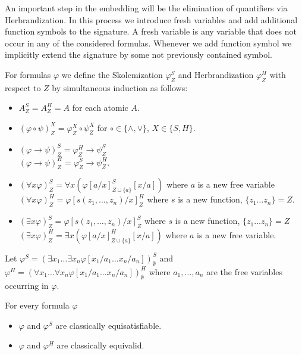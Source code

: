 \documentclass[a4paper,UKenglish,cleveref, autoref, thm-restate]{lipics-v2021}
\begin{document}
An important step in the embedding will be the elimination of quantifiers via Herbrandization.
In this process we introduce fresh variables and add additional function symbols to the signature.
A fresh variable is any variable that does not occur in any of the considered formulas.
Whenever we add function symbol we implicitly extend the signature by some not previously contained symbol.

\begin{definition}
	For formulas $\varphi$ we define the Skolemization $\varphi^S_Z$ and Herbrandization $\varphi^H_Z$ with respect to $Z$ by simultaneous induction as follows:
	\begin{itemize}
		\item $A^S_Z = A^H_Z = A$ for each atomic $A$.
		\item $(\varphi\circ\psi)^X_Z = \varphi^X_Z\circ\psi^X_Z$ for $\circ\in\{\wedge, \vee\}$, $X\in\{S, H\}$.
		\item $(\varphi\to\psi)^S_Z = \varphi^H_Z\to \psi^S_Z$\\$(\varphi\to\psi)^H_Z = \varphi^S_Z\to\psi^H_Z$.
		\item $(\forall x\varphi)^S_Z = \forall x(\varphi[a/x]^S_{Z\cup\{a\}}[x/a])$ where $a$ is a new free variable\\$(\forall x\varphi)^H_Z = \varphi[s(z_1,\dots,z_n)/x]^H_Z$ where $s$ is a new function, $\{z_1\dots z_n\} = Z$.
		\item $(\exists x\varphi)^S_Z = \varphi[s(z_1,\dots,z_n)/x]^S_Z$ where $s$ is a new function, $\{z_1\dots z_n\} = Z$\\$(\exists x\varphi)^H_Z = \exists x(\varphi[a/x]^H_{Z\cup\{a\}}[x/a])$ where $a$ is a new free variable.
	\end{itemize}
	Let $\varphi^S = (\exists x_1\dots\exists x_n \varphi[x_1/a_1\dots x_n/a_n])^S_\emptyset$ and $\varphi^H = (\forall x_1\dots\forall x_n \varphi[x_1/a_1\dots x_n/a_n])^H_\emptyset$ where $a_1,\dots,a_n$ are the free variables occurring in $\varphi$.
\end{definition}

\begin{theorem}
\label{thm:herbrand-skolem}
For every formula $\varphi$
	\begin{itemize}
		\item $\varphi$ and $\varphi^S$ are classically equisatisfiable.
		\item $\varphi$ and $\varphi^H$ are classically equivalid.
	\end{itemize}
\end{theorem}
\end{document}

